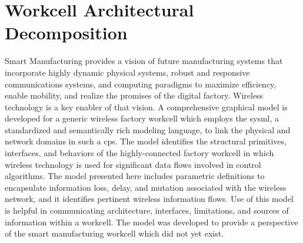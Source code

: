 
\chapter{Workcell Architectural Decomposition}\label{chapter:sysml}

\chapterintro*

Smart Manufacturing provides a vision of future manufacturing systems that incorporate highly dynamic physical systems, robust and responsive communications systems, and computing paradigms to maximize efficiency, enable mobility, and realize the promises of the digital factory.  Wireless technology is a key enabler of that vision. A comprehensive graphical model is developed for a generic wireless factory workcell which employs the \gls{sysml}, a standardized and semantically rich modeling language, to link the physical and network domains in such a \gls{cps}. The model identifies the structural primitives, interfaces, and behaviors of the highly-connected factory workcell in which wireless technology is used for significant data flows involved in control algorithms. The model presented here includes parametric definitions to encapsulate information loss, delay, and mutation associated with the wireless network, and it identifies pertinent wireless information flows.  Use of this model is helpful in communicating architecture, interfaces, limitations, and sources of information within a workcell.  The model was developed to provide a perspective of the smart manufacturing workcell which did not yet exist.

